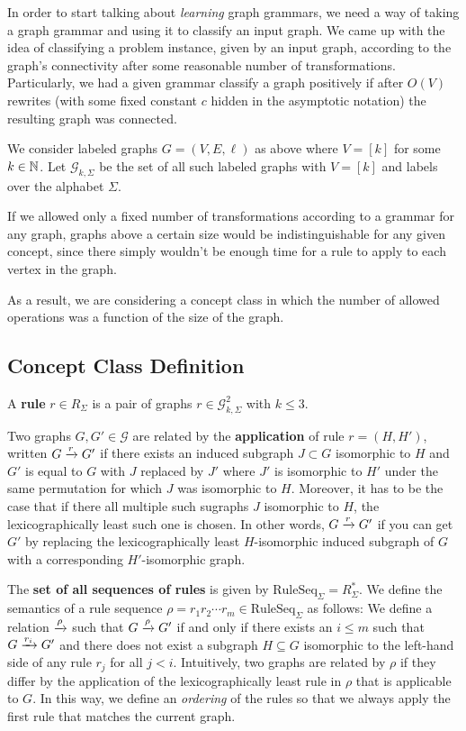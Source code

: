 \documentclass[]{article}
\def\RuleSeq{\mathrm{RuleSeq}\xspace}
\def\Graphs{\mathcal{G}\xspace}
\begin{document}
In order to start talking about \emph{learning} graph grammars, we need a way of
taking a graph grammar and using it to classify an input graph. We came up with
the idea of classifying a problem instance, given by an input graph, according to the graph's connectivity after some reasonable number of transformations. Particularly, we had a given grammar classify a graph positively if after $O(V)$ rewrites (with some fixed constant $c$ hidden in the asymptotic notation) the resulting graph was connected.

We consider labeled graphs $G = (V,E,\ell)$ as above where $V = [k]$ for some
$k\in \N$. Let $\Graphs_{k,\Sigma}$ be the set of all such labeled graphs with
$V=[k]$ and labels over the alphabet $\Sigma$.

If we allowed only a fixed number of transformations according to a grammar for
any graph, graphs above a certain size would be indistinguishable for any given
concept, since there simply wouldn't be enough time for a rule to apply to each
vertex in the graph.

As a result, we are considering a concept class in which the number of allowed
operations was a function of the size of the graph.

\subsection{Concept Class Definition}

A \textbf{rule} $r \in R_{\Sigma}$ is a pair of graphs
$r \in \Graphs_{k,\Sigma}^2$ with $k \leq 3$.

Two graphs $G,G' \in \Graphs$ are related by the \textbf{application} of rule
$r = (H,H')$, written $G \xrightarrow{r} G'$ if there exists an induced subgraph $J \subset G$
isomorphic to $H$ and $G'$ is equal to $G$ with $J$ replaced by $J'$ where $J'$
is isomorphic to $H'$ under the same permutation for which $J$ was isomorphic to
$H$. Moreover, it has to be the case that if there all multiple such sugraphs
$J$ isomorphic to $H$, the lexicographically least such one is chosen.
In other words, $G \xrightarrow{r} G'$ if you can get $G'$ by replacing the
lexicographically least $H$-isomorphic induced subgraph of $G$ with a corresponding
$H'$-isomorphic graph.

The \textbf{set of all sequences of rules} is given by
$\RuleSeq_{\Sigma} = R_{\Sigma}^*$. We define the semantics of a rule sequence
$\rho = r_1r_2\dotsm r_m \in \RuleSeq_{\Sigma}$ as follows: We define a relation
$\xrightarrow{\rho}$ such that $G \xrightarrow{\rho} G'$ if and only if there exists an
$i\leq m$ such that $G\xrightarrow{r_i} G'$ and there does not exist a subgraph
$H \subseteq G$ isomorphic to the left-hand side of any rule $r_j$ for all
$j < i$. Intuitively, two graphs are related by $\rho$ if they differ by the
application of the lexicographically least rule in $\rho$ that is applicable to
$G$. In this way, we define an \emph{ordering} of the rules so that we always apply
the first rule that matches the current graph.
\end{document}
